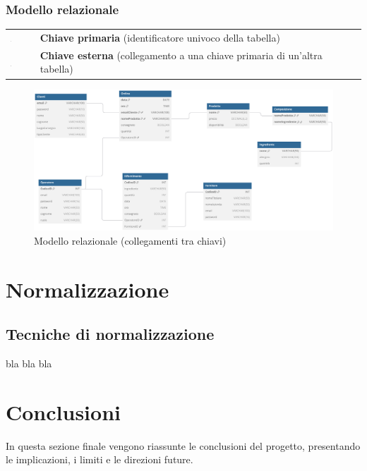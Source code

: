 \documentclass[12pt,a4paper]{article}
\begin{document}
    \newpage
    \subsubsection{Modello relazionale}
    \begin{tcolorbox}[
        colback=gray!8,  
        colframe=darkgray, 
        title=Legenda del modello relazionale
    ]
        \begin{tabular}{@{} >{\centering\arraybackslash}m{0.5cm} p{14cm} @{}}
            \includegraphics[width=0.025\textwidth]{figures/g132.pdf} & \textbf{Chiave primaria} (identificatore univoco della tabella) \\
            \addlinespace[0.5em]
            \includegraphics[width=0.025\textwidth]{figures/path621.pdf} & \textbf{Chiave esterna} (collegamento a una chiave primaria di un'altra tabella) \\ 
        \end{tabular}
    \end{tcolorbox}  
     
    \begin{figure}[H]
        \centering 
        \vspace{-10pt}  %
        \includegraphics[width=\textwidth]{figures/Relational_model.pdf}
        \vspace{-20pt}  %
        \caption{Modello relazionale (collegamenti tra chiavi)}
    \end{figure} 
    


    \newpage
    \section{Normalizzazione}
    
    \subsection{Tecniche di normalizzazione}
    bla bla bla

    \section{Conclusioni}
    In questa sezione finale vengono riassunte le conclusioni del progetto, presentando le implicazioni, i limiti e le direzioni future.
\end{document}
